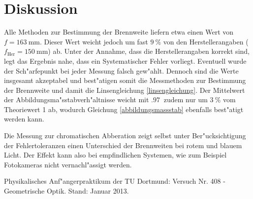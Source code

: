\clearpage
\section{Diskussion}
	\label{sec:diskussion}
	Alle Methoden zur Bestimmung der Brennweite liefern etwa einen Wert von $f = \SI{163}{\milli \meter}$. Dieser Wert weicht jedoch um fast $\SI{9}{\percent}$ von den Herstellerangaben ($f_\mathrm{Her} = \SI{150}{\milli \meter}$) ab.
	Unter der Annahme, dass die Herstellerangaben korrekt sind, legt das Ergebnis nahe, dass ein Systematischer Fehler vorliegt.
	Eventuell wurde der Sch"arfepunkt bei jeder Messung falsch gew"ahlt.
	Dennoch sind die Werte insgesamt akzeptabel und best"atigen somit die Messmethoden zur Bestimmung der Brennweite und damit die Linsengleichung \eqref{linsengleichung}.
	Der Mittelwert der Abbildungsma"sstabverh"altnisse weicht mit $\SI{.97}{}$ zudem nur um $\SI{3}{\percent}$ vom Theoriewert 1 ab, wodurch Gleichung \eqref{abbildungsmassstab} ebenfalls best"atigt werden kann.

	Die Messung zur chromatischen Abberation zeigt selbst unter Ber"ucksichtigung der Fehlertoleranzen einen Unterschied der Brennweiten bei rotem und blauem Licht.
	Der Effekt kann also bei empfindlichen Systemen, wie zum Beispiel Fotokameras nicht vernachl"assigt werden.

	\begin{thebibliography}{9}
	\label{sec:literaturverzeichnis}
		 Physikalisches Anf"angerpraktikum der TU Dortmund: Versuch Nr. 408 - Geometrische Optik. Stand: Januar 2013.
	\end{thebibliography}

